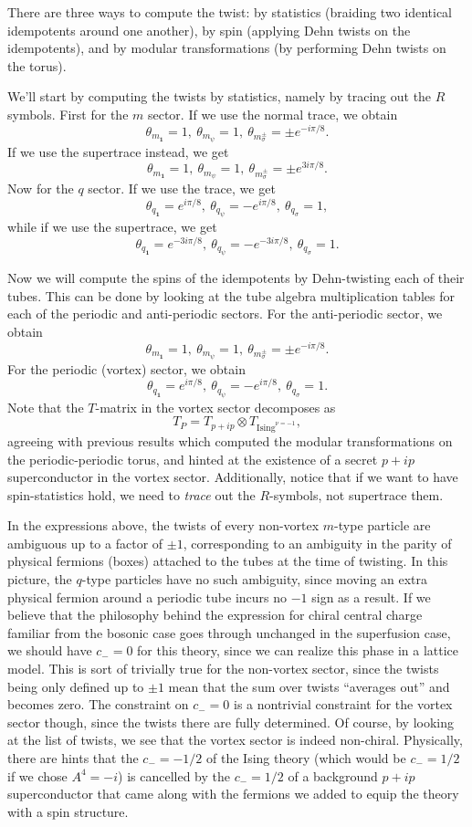 \documentclass[12pt,a4paper]{article}
\newcommand{\tp}{\otimes}
\newcommand{\unit}{\mathbf{1}}
\newcommand\be            {\begin{equation}}
\newcommand\ee            {\end{equation}}
\begin{document}
There are three ways to compute the twist: by statistics (braiding two identical idempotents around one another), by spin (applying Dehn twists on the idempotents), and by modular transformations (by performing Dehn twists on the torus). 

We'll start by computing the twists by statistics, namely by tracing out the $R$ symbols. 
First for the $m$ sector. 
If we use the normal trace, we obtain 
\be \theta_{m_\unit} = 1,\ \theta_{m_\psi} = 1,\ \theta_{m^\pm_\sigma} = \pm e^{-i\pi/8}.\ee
If we use the supertrace instead, we get 
\be \theta_{m_\unit} = 1,\ \theta_{m_\psi} = 1,\ \theta_{m^\pm_\sigma} = \pm e^{3i\pi/8}.\ee
Now for the $q$ sector. If we use the trace, we get 
\be \theta_{q_\unit} = e^{i\pi/8},\ \theta_{q_\psi} = -e^{i\pi/8},\ \theta_{q_\sigma} = 1,\ee
while if we use the supertrace, we get 
\be \theta_{q_\unit} = e^{-3i\pi/8},\ \theta_{q_\psi} = -e^{-3i\pi/8},\ \theta_{q_\sigma} = 1.\ee

Now we will compute the spins of the idempotents by Dehn-twisting each of their tubes. This can be done by looking at the tube algebra multiplication tables for each of the periodic and anti-periodic sectors. 
For the anti-periodic sector, we obtain 
\be \theta_{m_\unit} = 1,\ \theta_{m_\psi} = 1,\ \theta_{m^\pm_\sigma} = \pm e^{-i\pi/8}.\ee
For the periodic (vortex) sector, we obtain 
\be \theta_{q_\unit} = e^{i\pi/8},\ \theta_{q_\psi} = -e^{i\pi/8},\ \theta_{q_\sigma} = 1.\ee
Note that the $T$-matrix in the vortex sector decomposes as 
\be T_P = T_{p+ip} \tp T_{\text{Ising}^{\nu = -1}},\ee
agreeing with previous results which computed the modular transformations on the periodic-periodic torus, and hinted at the existence of a secret $p+ip$ superconductor in the vortex sector. Additionally, notice that if we want to have spin-statistics hold, we need to {\it trace} out the $R$-symbols, not supertrace them.

In the expressions above, the twists of every non-vortex $m$-type particle are ambiguous up to a factor of $\pm1$, corresponding to an ambiguity in the parity of physical fermions (boxes) attached to the tubes at the time of twisting. In this picture, the $q$-type particles have no such ambiguity, since moving an extra physical fermion around a periodic tube incurs no $-1$ sign as a result.  
If we believe that the philosophy behind the expression for chiral central charge familiar from the bosonic case goes through unchanged in the superfusion case, we should have $c_-=0$ for this theory, since we can realize this phase in a lattice model. This is sort of trivially true for the non-vortex sector, since the twists being only defined up to $\pm1$ mean that the sum over twists ``averages out'' and becomes zero. The constraint on $c_-=0$ is a nontrivial constraint for the vortex sector though, since the twists there are fully determined. Of course, by looking at the list of twists, we see that the vortex sector is indeed non-chiral. Physically, there are hints that the $c_-=-1/2$ of the Ising theory (which would be $c_- = 1/2$ if we chose $A^4=-i$) is cancelled by the $c_-=1/2$ of a background $p+ip$ superconductor that came along with the fermions we added to equip the theory with a spin structure. 
\end{document}
